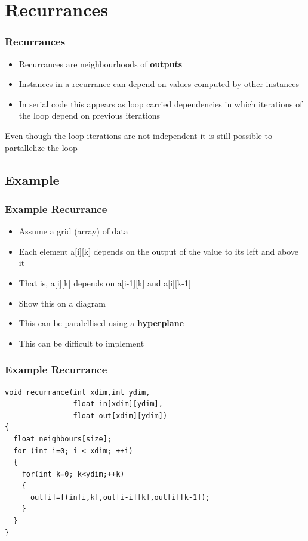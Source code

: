 \documentclass{beamer}
\begin{document}
\section{Recurrances}
\begin{frame}
\frametitle{Recurrances}
    \begin{itemize}
      \item Recurrances are neighbourhoods of \textbf{outputs}
      \item Instances in a recurrance can depend on values computed by other instances
      \item In serial code this appears as loop carried dependencies in which iterations of the loop depend on previous iterations
    \end{itemize}
Even though the loop iterations are not independent it is still possible to partallelize the loop
\end{frame}
\subsection{Example}
\begin{frame}
\frametitle{Example Recurrance}
\begin{itemize}
	\item Assume a grid (array) of data
	\item Each element a[i][k] depends on the output of the value to its left and above it
	\item That is, a[i][k] depends on a[i-1][k] and a[i][k-1]
	\item Show this on a diagram
	\item This can be paralellised using a \textbf{hyperplane}
	\item This can be difficult to implement
\end{itemize}
\end{frame}
\begin{frame}[fragile=singleslide]
	\frametitle{Example Recurrance}
\begin{lstlisting}
void recurrance(int xdim,int ydim, 
                float in[xdim][ydim], 
                float out[xdim][ydim])
{
  float neighbours[size];
  for (int i=0; i < xdim; ++i)
  {
    for(int k=0; k<ydim;++k)
    {
      out[i]=f(in[i,k],out[i-i][k],out[i][k-1]);
    }
  }
}
\end{lstlisting}
\end{frame}
\end{document}
